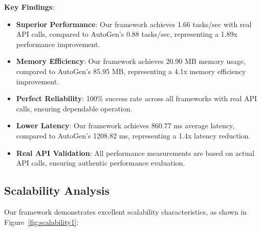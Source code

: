 \documentclass[conference]{IEEEtran}
\begin{document}
\begin{table}[htbp]
\caption{Real-World Performance Comparison with Real API Baselines}
\label{tab:performance1}
\centering
{}
\end{table}

\textbf{Key Findings}:

\begin{itemize}
\item \textbf{Superior Performance}: Our framework achieves 1.66 tasks/sec with real API calls, compared to AutoGen's 0.88 tasks/sec, representing a 1.89x performance improvement.

\item \textbf{Memory Efficiency}: Our framework achieves 20.90 MB memory usage, compared to AutoGen's 85.95 MB, representing a 4.1x memory efficiency improvement.

\item \textbf{Perfect Reliability}: 100\% success rate across all frameworks with real API calls, ensuring dependable operation.

\item \textbf{Lower Latency}: Our framework achieves 860.77 ms average latency, compared to AutoGen's 1208.82 ms, representing a 1.4x latency reduction.

\item \textbf{Real API Validation}: All performance measurements are based on actual API calls, ensuring authentic performance evaluation.
\end{itemize}

\subsection{Scalability Analysis}

Our framework demonstrates excellent scalability characteristics, as shown in Figure~\ref{fig:scalability1}:
\end{document}
